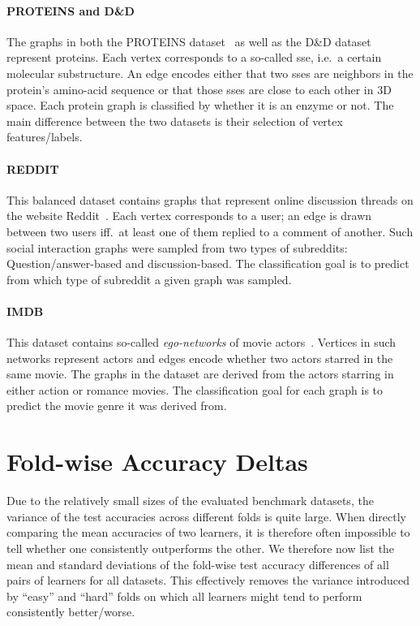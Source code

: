 \paragraph{PROTEINS and D\&D}
The graphs in both the PROTEINS dataset~\cite{Borgwardt2005a} as well as the D\&D dataset~\cite{Dobson2003} represent proteins.
Each vertex corresponds to a so-called \ac{sse}, i.e.\ a certain molecular substructure.
An edge encodes either that two \acp{sse} are neighbors in the protein's amino-acid sequence or that those \acp{sse} are close to each other in 3D space.
Each protein graph is classified by whether it is an enzyme or not.
The main difference between the two datasets is their selection of vertex features/labels.

\paragraph{REDDIT}
This balanced dataset contains graphs that represent online discussion threads on the website Reddit~\cite{Yanardag2015}.
Each vertex corresponds to a user; an edge is drawn between two users iff.\ at least one of them replied to a comment of another.
Such social interaction graphs were sampled from two types of subreddits:
Question/answer-based and discussion-based.
The classification goal is to predict from which type of subreddit a given graph was sampled.

\paragraph{IMDB}
This dataset contains so-called \textit{ego-networks} of movie actors~\cite{Yanardag2015}.
Vertices in such networks represent actors and edges encode whether two actors starred in the same movie.
The graphs in the dataset are derived from the actors starring in either action or romance movies.
The classification goal for each graph is to predict the movie genre it was derived from.

\section{Fold-wise Accuracy Deltas}%
\label{sec:appendix:fold-diffs}

Due to the relatively small sizes of the evaluated benchmark datasets, the variance of the test accuracies across different folds is quite large.
When directly comparing the mean accuracies of two learners, it is therefore often impossible to tell whether one consistently outperforms the other.
We therefore now list the mean and standard deviations of the fold-wise test accuracy differences of all pairs of learners for all datasets.
This effectively removes the variance introduced by ``easy'' and ``hard'' folds on which all learners might tend to perform consistently better/worse.

